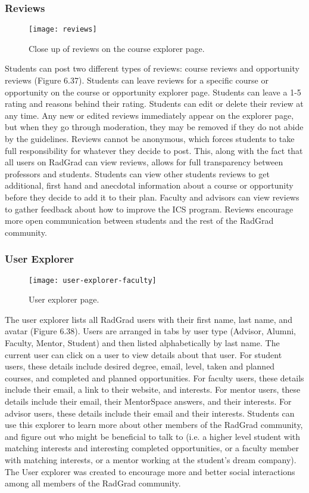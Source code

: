 \subsubsection{Reviews}
\begin{figure}[htbp!]
\centering
\texttt{[image: reviews]}
\caption{Close up of reviews on the course explorer page.}
\end{figure}
Students can post two different types of reviews: course reviews and opportunity reviews (Figure 6.37). Students can leave reviews for a specific course or opportunity on the course or opportunity explorer page. Students can leave a 1-5 rating and reasons behind their rating. Students can edit or delete their review at any time. Any new or edited reviews immediately appear on the explorer page, but when they go through moderation, they may be removed if they do not abide by the guidelines. Reviews cannot be anonymous, which forces students to take full responsibility for whatever they decide to post. This, along with the fact that all users on RadGrad can view reviews, allows for full transparency between professors and students. Students can view other students reviews to get additional, first hand and anecdotal information about a course or opportunity before they decide to add it to their plan. Faculty and advisors can view reviews to gather feedback about how to improve the ICS program. Reviews encourage more open communication between students and the rest of the RadGrad community.

\subsubsection{User Explorer}
\begin{figure}[htbp!]
\centering
\texttt{[image: user-explorer-faculty]}
\caption{User explorer page.}
\end{figure}

The user explorer lists all RadGrad users with their first name, last name, and avatar (Figure 6.38). Users are arranged in tabs by user type (Advisor, Alumni, Faculty, Mentor, Student) and then listed alphabetically by last name. The current user can click on a user to view details about that user. For student users, these details include desired degree, email, level, taken and planned courses, and completed and planned opportunities. For faculty users, these details include their email, a link to their website, and interests. For mentor users, these details include their email, their MentorSpace answers, and their interests. For advisor users, these details include their email and their interests. Students can use this explorer to learn more about other members of the RadGrad community, and figure out who might be beneficial to talk to (i.e. a higher level student with matching interests and interesting completed opportunities, or a faculty member with matching interests, or a mentor working at the student's dream company). The User explorer was created to encourage more and better social interactions among all members of the RadGrad community.


